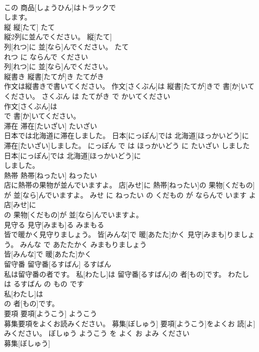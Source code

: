 \documentclass[8pt]{extreport}
\begin{document}
\begin{CJK}{UTF8}{min}
\\	この 商品[しょうひん]はトラックで
\\	します。			
\\	縦	縦[たて]	たて	
\\	縦2列に並んでください。	縦[たて] 
\\	列[れつ]に 並[なら]んでください。	たて 
\\	れつ に ならんで ください	
\\	列[れつ]に 並[なら]んでください。			
\\	縦書き	縦書[たてが]き	たてがき	
\\	作文は縦書きで書いてください。	作文[さくぶん]は 縦書[たてが]きで 書[か]いてください。	さくぶん は たてがき で かいてください	
\\	作文[さくぶん]は
\\	で 書[か]いてください。			
\\	滞在	滞在[たいざい]	たいざい	
\\	日本では北海道に滞在しました。	日本[にっぽん]では 北海道[ほっかいどう]に 滞在[たいざい]しました。	にっぽん で は ほっかいどう に たいざい しました	
\\	日本[にっぽん]では 北海道[ほっかいどう]に
\\	しました。			
\\	熱帯	熱帯[ねったい]	ねったい	
\\	店に熱帯の果物が並んでいますよ。	店[みせ]に 熱帯[ねったい]の 果物[くだもの]が 並[なら]んでいますよ。	みせ に ねったい の くだもの が ならんで います よ	
\\	店[みせ]に
\\	の 果物[くだもの]が 並[なら]んでいますよ。			
\\	見守る	見守[みまも]る	みまもる	
\\	皆で暖かく見守りましょう。	皆[みんな]で 暖[あたた]かく 見守[みまも]りましょう。	みんな で あたたかく みまもりましょう	
\\	皆[みんな]で 暖[あたた]かく
\\	留守番	留守番[るすばん]	るすばん	
\\	私は留守番の者です。	私[わたし]は 留守番[るすばん]の 者[もの]です。	わたし は るすばん の もの です	
\\	私[わたし]は
\\	の 者[もの]です。			
\\	要項	要項[ようこう]	ようこう	
\\	募集要項をよくお読みください。	募集[ぼしゅう] 要項[ようこう]をよくお 読[よ]みください。	ぼしゅう ようこう を よく お よみ ください	
\\	募集[ぼしゅう]

\end{CJK}
\end{document}
